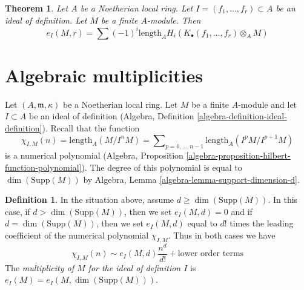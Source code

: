 \documentclass[10pt,a4paper]{amsart}
\theoremstyle{plain}
\newtheorem{theorem}[subsection]{Theorem}
\theoremstyle{definition}
\newtheorem{definition}[subsection]{Definition}
\theoremstyle{remark}
\numberwithin{equation}{subsection}
\newenvironment{reference}{}{}
\begin{document}
\begin{theorem}
\label{theorem-multiplicity-with-koszul}
\begin{reference}
\cite[Theorem 1 in part B of Chapter IV]{Serre_algebre_locale}
\end{reference}
Let $A$ be a Noetherian local ring. Let $I = (f_1, \ldots, f_r) \subset A$
be an ideal of definition. Let $M$ be a finite $A$-module. Then
$$
e_I(M, r) = \sum
(-1)^i\text{length}_A H_i(K_\bullet(f_1, \ldots, f_r) \otimes_A M)
$$
\end{theorem}



\section{Algebraic multiplicities}
\label{section-multiplicities}

\noindent
Let $(A, \mathfrak m, \kappa)$ be a Noetherian local ring.
Let $M$ be a finite $A$-module and let $I \subset A$ be an ideal
of definition (Algebra, Definition \ref{algebra-definition-ideal-definition}).
Recall that the function
$$
\chi_{I, M}(n) = \text{length}_A(M/I^nM) =
\sum\nolimits_{p = 0, \ldots, n - 1} \text{length}_A(I^pM/I^{p + 1}M)
$$
is a numerical polynomial
(Algebra, Proposition \ref{algebra-proposition-hilbert-function-polynomial}).
The degree of this polynomial is equal to $\dim(\text{Supp}(M))$ by
Algebra, Lemma \ref{algebra-lemma-support-dimension-d}.

\begin{definition}
\label{definition-multiplicity}
In the situation above, assume $d \geq \dim(\text{Supp}(M))$.
In this case, if  $d > \dim(\text{Supp}(M))$, then we set $e_I(M, d) = 0$
and if $d = \dim(\text{Supp}(M))$, then we set $e_I(M, d)$ equal to $d!$
times the leading coefficient of the numerical polynomial $\chi_{I, M}$.
Thus in both cases we have
$$
\chi_{I, M}(n) \sim e_I(M, d) \frac{n^d}{d!} + \text{lower order terms}
$$
The {\it multiplicity of $M$ for the ideal of definition $I$}
is $e_I(M) = e_I(M, \dim(\text{Supp}(M)))$.
\end{definition}
\end{document}
